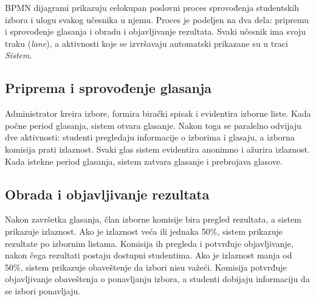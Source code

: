 BPMN dijagrami prikazuju celokupan poslovni proces sprovođenja studentskih izbora i ulogu svakog učesnika u njemu. Proces je podeljen na dva dela: pripremu i sprovođenje glasanja i obradu i objavljivanje rezultata. Svaki učesnik ima svoju traku (\textit{lane}), a aktivnosti koje se izvršavaju automatski prikazane su u traci \textit{Sistem}.

\subsection{Priprema i sprovođenje glasanja}

Administrator kreira izbore, formira birački spisak i evidentira izborne liste. Kada počne period glasanja, sistem otvara glasanje. Nakon toga se paralelno odvijaju dve aktivnosti: studenti pregledaju informacije o izborima i glasaju, a izborna komisija prati izlaznost. Svaki glas sistem evidentira anonimno i ažurira izlaznost. Kada istekne period glasanja, sistem zatvara glasanje i prebrojava glasove.


\subsection{Obrada i objavljivanje rezultata}

Nakon završetka glasanja, član izborne komisije bira pregled rezultata, a sistem prikazuje izlaznost. Ako je izlaznost veća ili jednaka 50\%, sistem prikazuje rezultate po izbornim listama. Komisija ih pregleda i potvrđuje objavljivanje, nakon čega rezultati postaju dostupni studentima. Ako je izlaznost manja od 50\%, sistem prikazuje obaveštenje da izbori nisu važeći. Komisija potvrđuje objavljivanje obaveštenja o ponavljanju izbora, a studenti dobijaju informaciju da se izbori ponavljaju.

